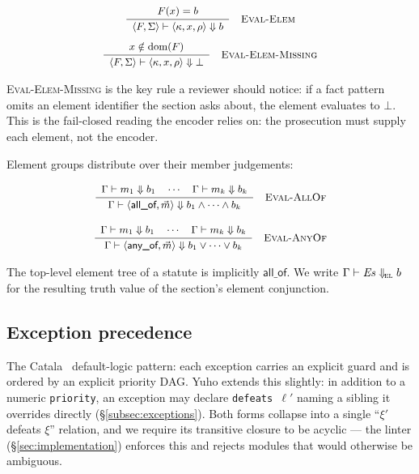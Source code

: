\begin{equation*}
\small
\inferrule[Eval-Elem]
  {F(x) = b}
  {\langle F, \Sigma \rangle \vdash \langle \kappa, x, \rho
   \rangle \Downarrow b}
\end{equation*}
\begin{equation*}
\small
\inferrule[Eval-Elem-Missing]
  {x \notin \mathrm{dom}(F)}
  {\langle F, \Sigma \rangle \vdash \langle \kappa, x, \rho
   \rangle \Downarrow \bot}
\end{equation*}

\textsc{Eval-Elem-Missing} is the key rule a reviewer should
notice: if a fact pattern omits an element identifier the section
asks about, the element evaluates to $\bot$. This is the
fail-closed reading the encoder relies on: the prosecution must
supply each element, not the encoder.

Element groups distribute over their member judgements:

\begin{equation*}
\small
\inferrule[Eval-AllOf]
  {\Gamma \vdash m_1 \Downarrow b_1 \quad \cdots \quad
   \Gamma \vdash m_k \Downarrow b_k}
  {\Gamma \vdash \langle \textsf{all\_of}, \vec{m} \rangle
   \Downarrow b_1 \wedge \cdots \wedge b_k}
\end{equation*}

\begin{equation*}
\small
\inferrule[Eval-AnyOf]
  {\Gamma \vdash m_1 \Downarrow b_1 \quad \cdots \quad
   \Gamma \vdash m_k \Downarrow b_k}
  {\Gamma \vdash \langle \textsf{any\_of}, \vec{m} \rangle
   \Downarrow b_1 \vee \cdots \vee b_k}
\end{equation*}

The top-level element tree of a statute is implicitly
$\textsf{all\_of}$. We write $\Gamma \vdash \mathit{Es}
\Downarrow_{\!\textsc{el}} b$ for the resulting truth value of
the section's element conjunction.

\subsection{Exception precedence}
\label{subsec:semantics-exceptions}

The Catala~\cite{catala2021} default-logic pattern: each
exception carries an explicit guard and is ordered by an explicit
priority DAG. Yuho extends this slightly: in addition to a
numeric \texttt{priority}, an exception may declare
\texttt{defeats $\ell'$} naming a sibling it overrides directly
(\S\ref{subsec:exceptions}). Both forms collapse into a single
``$\xi'$ defeats $\xi$'' relation, and we require its transitive
closure to be acyclic --- the linter
(\S\ref{sec:implementation}) enforces this and rejects modules
that would otherwise be ambiguous.

